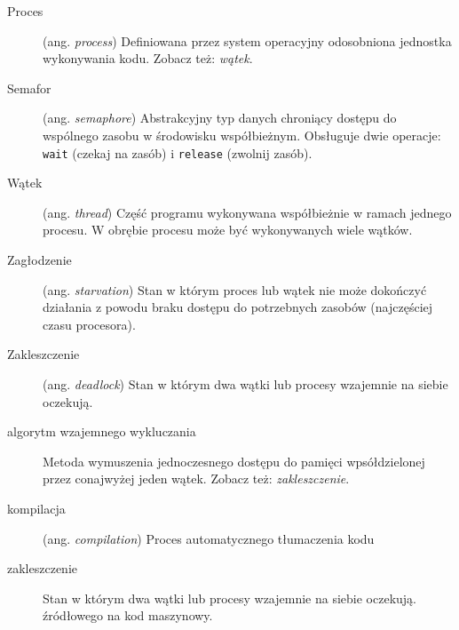 \documentclass[12pt]{article}
\begin{document}
\begin{description}
    \item[Proces] (ang. \emph{process}) Definiowana przez system operacyjny odosobniona jednostka wykonywania kodu. Zobacz też: \emph{wątek}.
    \item[Semafor] (ang. \emph{semaphore}) Abstrakcyjny typ danych chroniący dostępu do wspólnego zasobu w środowisku współbieżnym. Obsługuje dwie operacje: \texttt{wait} (czekaj na zasób) i \texttt{release} (zwolnij zasób).
    \item[Wątek] (ang. \emph{thread}) Część programu wykonywana współbieżnie w ramach jednego procesu. W obrębie procesu może być wykonywanych wiele wątków.
    \item[Zagłodzenie] (ang. \emph{starvation}) Stan w którym proces lub wątek nie może dokończyć działania z powodu braku dostępu do potrzebnych zasobów (najczęściej czasu procesora).
    \item[Zakleszczenie] (ang. \emph{deadlock}) Stan w którym dwa wątki lub procesy wzajemnie na siebie oczekują.
    \item[algorytm wzajemnego wykluczania] Metoda wymuszenia jednoczesnego dostępu do pamięci wpsółdzielonej przez conajwyżej jeden wątek. Zobacz też: \emph{zakleszczenie}.
    \item[kompilacja] (ang. \emph{compilation}) Proces automatycznego tłumaczenia kodu
    \item[zakleszczenie] Stan w którym dwa wątki lub procesy wzajemnie na siebie oczekują.
    źródłowego na kod maszynowy.
\end{description}
\end{document}
